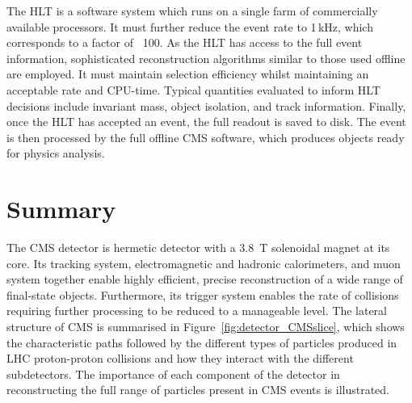 The HLT is a software system which runs on a single farm of commercially available processors. %
It must further reduce the event rate to 1\,kHz, which corresponds to a factor of ~100.
As the HLT has access to the full event information, sophisticated reconstruction algorithms similar to those used offline are employed. 
It must maintain selection efficiency whilst maintaining an acceptable rate and CPU-time. 
Typical quantities evaluated to inform HLT decisions include invariant mass, object isolation, and track information.
Finally, once the HLT has accepted an event, the full readout is saved to disk.
The event is then processed by the full offline CMS software, which produces objects ready for physics analysis.


\section{Summary}

The CMS detector is hermetic detector with a \SI{3.8}{T} solenoidal magnet at its core.
Its tracking system, electromagnetic and hadronic calorimeters, and muon system 
together enable highly efficient, precise reconstruction of a wide range of final-state objects.
Furthermore, its trigger system enables the rate of collisions 
requiring further processing to be reduced to a manageable level.
The lateral structure of CMS is summarised in Figure~\ref{fig:detector_CMSslice}, 
which shows the characteristic paths followed by the different types of particles 
produced in LHC proton-proton collisions and how they interact with the different subdetectors.
The importance of each component of the detector in reconstructing 
the full range of particles present in CMS events is illustrated.

